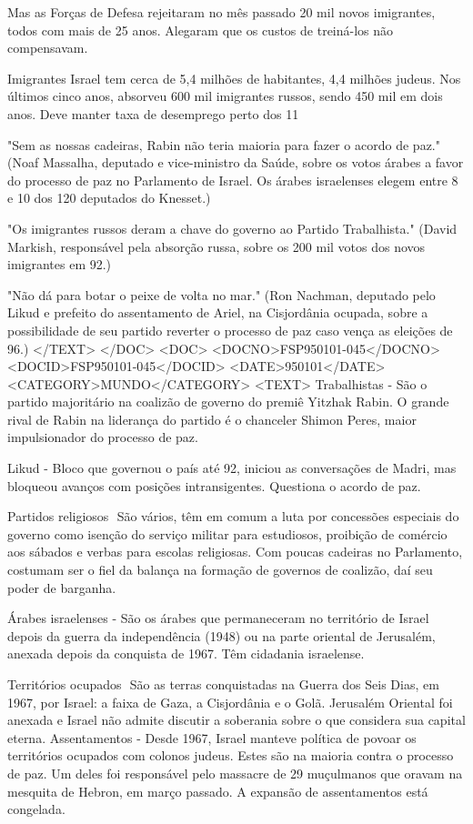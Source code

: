 Mas as Forças de Defesa rejeitaram no mês passado 20 mil novos imigrantes, todos com mais de 25 anos. Alegaram que os custos de treiná-los não compensavam.

Imigrantes 
Israel tem cerca de 5,4 milhões de habitantes, 4,4 milhões judeus. Nos últimos cinco anos, absorveu 600 mil imigrantes russos, sendo 450 mil em dois anos. Deve manter taxa de desemprego perto dos 11%

"Sem as nossas cadeiras, Rabin não teria maioria para fazer o acordo de paz."
(Noaf Massalha, deputado e vice-ministro da Saúde, sobre os votos árabes a favor do processo de paz no Parlamento de Israel. Os árabes israelenses elegem entre 8 e 10 dos 120 deputados do Knesset.)

"Os imigrantes russos deram a chave do governo ao Partido Trabalhista."
(David Markish, responsável pela absorção russa, sobre os 200 mil votos dos novos imigrantes em 92.)

"Não dá para botar o peixe de volta no mar."
(Ron Nachman, deputado pelo Likud e prefeito do assentamento de Ariel, na Cisjordânia ocupada, sobre a possibilidade de seu partido reverter o processo de paz caso vença as eleições de 96.)
</TEXT>
</DOC>
<DOC>
<DOCNO>FSP950101-045</DOCNO>
<DOCID>FSP950101-045</DOCID>
<DATE>950101</DATE>
<CATEGORY>MUNDO</CATEGORY>
<TEXT>
Trabalhistas - São o partido majoritário na coalizão de governo do premiê Yitzhak Rabin. O grande rival de Rabin na liderança do partido é o chanceler Shimon Peres, maior impulsionador do processo de paz.

Likud - Bloco que governou o país até 92, iniciou as conversações de Madri, mas bloqueou avanços com posições intransigentes. Questiona o acordo de paz.

Partidos religiosos  São vários, têm em comum a luta por concessões especiais do governo como isenção do serviço militar para estudiosos, proibição de comércio aos sábados e verbas para escolas religiosas. Com poucas cadeiras no Parlamento, costumam ser o fiel da balança na formação de governos de coalizão, daí seu poder de barganha.

Árabes israelenses - São os árabes que permaneceram no território de Israel depois da guerra da independência (1948) ou na parte oriental de Jerusalém, anexada depois da conquista de 1967. Têm cidadania israelense.

Territórios ocupados  São as terras conquistadas na Guerra dos Seis Dias, em 1967, por Israel: a faixa de Gaza, a Cisjordânia e o Golã. Jerusalém Oriental foi anexada e Israel não admite discutir a soberania sobre o que considera sua capital eterna.
Assentamentos - Desde 1967, Israel manteve política de povoar os territórios ocupados com colonos judeus. Estes são na maioria contra o processo de paz. Um deles foi responsável pelo massacre de 29 muçulmanos que oravam na mesquita de Hebron, em março passado. A expansão de assentamentos está congelada.


